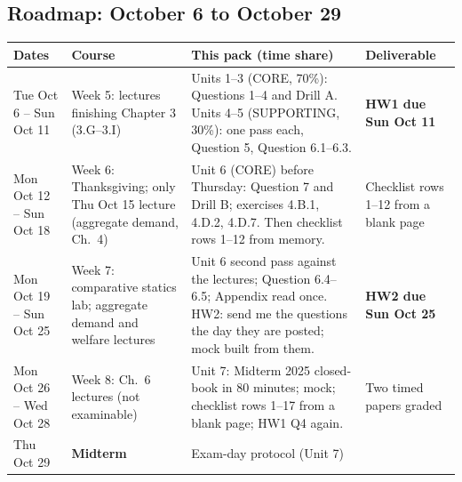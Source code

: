 \documentclass[11pt]{article}
\begin{document}
\subsection*{Roadmap: October 6 to October 29}
\begin{center}\small
\begin{tabular}{p{2.3cm}p{4.3cm}p{5.5cm}p{2.5cm}}
\toprule
Dates & Course & This pack (time share) & Deliverable\\
\midrule
Tue Oct 6 -- Sun Oct 11 & Week 5: lectures finishing Chapter 3 (3.G--3.I) & Units 1--3 (CORE, 70\%): Questions 1--4 and Drill A. Units 4--5 (SUPPORTING, 30\%): one pass each, Question 5, Question 6.1--6.3. & \textbf{HW1 due Sun Oct 11}\\
Mon Oct 12 -- Sun Oct 18 & Week 6: Thanksgiving; only Thu Oct 15 lecture (aggregate demand, Ch.~4) & Unit 6 (CORE) before Thursday: Question 7 and Drill B; exercises 4.B.1, 4.D.2, 4.D.7. Then checklist rows 1--12 from memory. & Checklist rows 1--12 from a blank page\\
Mon Oct 19 -- Sun Oct 25 & Week 7: comparative statics lab; aggregate demand and welfare lectures & Unit 6 second pass against the lectures; Question 6.4--6.5; Appendix read once. HW2: send me the questions the day they are posted; mock built from them. & \textbf{HW2 due Sun Oct 25}\\
Mon Oct 26 -- Wed Oct 28 & Week 8: Ch.~6 lectures (not examinable) & Unit 7: Midterm 2025 closed-book in 80 minutes; mock; checklist rows 1--17 from a blank page; HW1 Q4 again. & Two timed papers graded\\
Thu Oct 29 & \textbf{Midterm} & Exam-day protocol (Unit 7) & \\
\bottomrule
\end{tabular}
\end{center}
\end{document}
